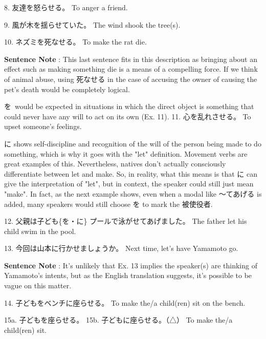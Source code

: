 \par{8. 友達を怒らせる。 \hfill\break
To anger a friend. }

\par{9. 風が木を揺らせていた。 \hfill\break
The wind shook the tree(s). }

\par{10. ネズミを死なせる。 \hfill\break
To make the rat die. }

\par{\textbf{Sentence Note }: This last sentence fits in this description as bringing about an effect such as making something die is a means of a compelling force. If we think of animal abuse, using 死なせる in the case of accusing the owner of causing the pet's death would be completely logical. }

\par{ を would be expected in situations in which the direct object is something that could never have any will to act on its own (Ex. 11). }
11. 心を乱れさせる。 \hfill\break
To upset someone's feelings. 
\par{ に shows self-discipline and recognition of the will of the person being made to do something, which is why it goes with the "let" definition. Movement verbs are great examples of this. Nevertheless, natives don't actually consciously differentiate between let and make. So, in reality, what this means is that に can give the interpretation of "let", but in context, the speaker could still just mean "make". In fact, as the next example shows, even when a modal like ～てあげる is added, many speakers would still choose を to mark the 被使役者. }

\par{12. 父親は子ども\{を・に\} プールで泳がせてあげました。 \hfill\break
The father let his child swim in the pool. }

\par{13. 今回は山本に行かせましょうか。 \hfill\break
Next time, let's have Yamamoto go. }

\par{\textbf{Sentence Note }: It's unlikely that Ex. 13 implies the speaker(s) are thinking of Yamamoto's intents, but as the English translation suggests, it's possible to be vague on this matter. }

\par{14. 子どもをベンチに座らせる。 \hfill\break
To make the\slash a child(ren) sit on the bench. }

\par{15a. 子どもを座らせる。 \hfill\break
15b. 子どもに座らせる。（△） \hfill\break
To make the\slash a child(ren) sit. }

